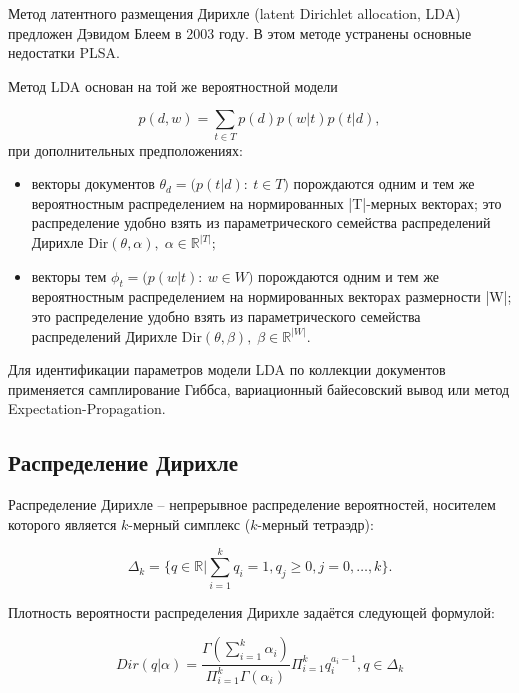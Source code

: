 \documentclass[a4paper,12pt,preview]{report} %
\begin{document}
	Метод латентного размещения Дирихле \cite{21} (latent Dirichlet allocation, LDA) предложен Дэвидом Блеем в 2003 году. В этом методе устранены основные недостатки PLSA.
	
	Метод LDA основан на той же вероятностной модели
	
	\begin{equation}
	p(d,w) = \sum_{t\in T} p(d) p(w|t) p(t|d),
	\end{equation}
	при дополнительных предположениях:
	
	\begin{itemize}
	\item векторы документов $\theta_d = \bigl(p(t|d):\: t\in T\bigr)$ порождаются одним и тем же вероятностным распределением на нормированных |T|-мерных векторах; это распределение удобно взять из параметрического семейства распределений Дирихле $\mathrm{Dir}(\theta,\alpha),\; \alpha\in\mathbb{R}^{|T|};$
	\item векторы тем $\phi_t = \bigl(p(w|t):\: w\in W\bigr)$ порождаются одним и тем же вероятностным распределением на нормированных векторах размерности |W|; это распределение удобно взять из параметрического семейства распределений Дирихле $\mathrm{Dir}(\theta,\beta),\; \beta\in\mathbb{R}^{|W|}$.
	
\end{itemize}
	
	Для идентификации параметров модели LDA по коллекции документов применяется самплирование Гиббса, вариационный байесовский вывод или метод Expectation-Propagation.
	
	
	
	
	
	\subsection{Распределение Дирихле}
	Распределение Дирихле \cite{20} -- непрерывное распределение вероятностей, носителем которого является $k$-мерный симплекс ($k$-мерный тетраэдр):
	
	\begin{equation}
	\Delta_k = \{q \in \mathbb{R} | \sum_{i=1}^k q_i = 1, q_j \geq 0, j = 0, \dots, k\}.
	\end{equation}
	
	Плотность вероятности распределения Дирихле задаётся следующей формулой:
	
	\begin{equation}
	Dir(q | \alpha) = \frac{\Gamma (\sum_{i=1}^k \alpha_i)}{\Pi_{i=1}^k \Gamma(\alpha_i)} \Pi_{i=1}^k q_i^{a_i - 1}, q \in \Delta_k
	\end{equation}
	
\end{document}

